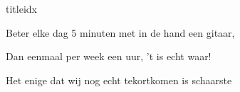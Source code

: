 \documentclass[a4,openany,portrait,tikz]{article}
\begin{document}
\begin{songs}{titleidx}
\renewcommand{\thesongnum}{Y}
	
\newpage

\renewcommand{\thesongnum}{Z}
	 
\newpage



			Beter elke dag 5 minuten met in de hand een gitaar,
			
			Dan eenmaal per week een uur, 't is echt waar!
		\endscripture	
	
		Het enige dat wij nog echt tekortkomen is schaarste 
		\endscripture	
		

	





%			
\end{songs}




%
%
\end{document}
